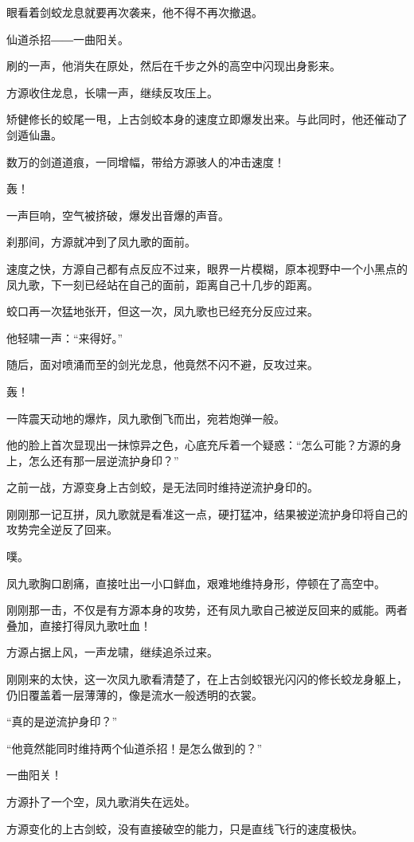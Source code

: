 \begin{this_body}
眼看着剑蛟龙息就要再次袭来，他不得不再次撤退。

仙道杀招――一曲阳关。

刷的一声，他消失在原处，然后在千步之外的高空中闪现出身影来。

方源收住龙息，长啸一声，继续反攻压上。

矫健修长的蛟尾一甩，上古剑蛟本身的速度立即爆发出来。与此同时，他还催动了剑遁仙蛊。

数万的剑道道痕，一同增幅，带给方源骇人的冲击速度！

轰！

一声巨响，空气被挤破，爆发出音爆的声音。

刹那间，方源就冲到了凤九歌的面前。

速度之快，方源自己都有点反应不过来，眼界一片模糊，原本视野中一个小黑点的凤九歌，下一刻已经站在自己的面前，距离自己十几步的距离。

蛟口再一次猛地张开，但这一次，凤九歌也已经充分反应过来。

他轻啸一声：“来得好。”

随后，面对喷涌而至的剑光龙息，他竟然不闪不避，反攻过来。

轰！

一阵震天动地的爆炸，凤九歌倒飞而出，宛若炮弹一般。

他的脸上首次显现出一抹惊异之色，心底充斥着一个疑惑：“怎么可能？方源的身上，怎么还有那一层逆流护身印？”

之前一战，方源变身上古剑蛟，是无法同时维持逆流护身印的。

刚刚那一记互拼，凤九歌就是看准这一点，硬打猛冲，结果被逆流护身印将自己的攻势完全逆反了回来。

噗。

凤九歌胸口剧痛，直接吐出一小口鲜血，艰难地维持身形，停顿在了高空中。

刚刚那一击，不仅是有方源本身的攻势，还有凤九歌自己被逆反回来的威能。两者叠加，直接打得凤九歌吐血！

方源占据上风，一声龙啸，继续追杀过来。

刚刚来的太快，这一次凤九歌看清楚了，在上古剑蛟银光闪闪的修长蛟龙身躯上，仍旧覆盖着一层薄薄的，像是流水一般透明的衣裳。

“真的是逆流护身印？”

“他竟然能同时维持两个仙道杀招！是怎么做到的？”

一曲阳关！

方源扑了一个空，凤九歌消失在远处。

方源变化的上古剑蛟，没有直接破空的能力，只是直线飞行的速度极快。


\end{this_body}
